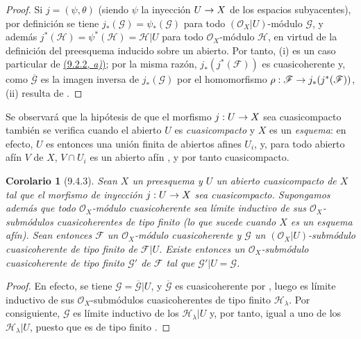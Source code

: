 \documentclass[oneside]{amsart}
\theoremstyle{ega-env-style}
\theoremstyle{ega-thm-env-style}
\newtheorem*{corollary}{Corolario}
\theoremstyle{ega-defn-env-style}
\renewcommand{\to}{\mathchoice{\longrightarrow}{\rightarrow}{\rightarrow}{\rightarrow}}
\let\EGAOriginalLabel\label
\renewcommand{\label}[1]{\phantomsection\EGAOriginalLabel{#1}}
\begin{document}
\begin{proof}
Si $j=(\psi,\theta)$ (siendo $\psi$ la inyección $U\to X$ de los espacios subyacentes),
por definición se tiene $j_*(\mathscr{G})=\psi_*(\mathscr{G})$ para todo
$(\mathscr{O}_X|U)$-módulo $\mathscr{G}$, y además
$j^*(\mathscr{H})=\psi^*(\mathscr{H})=\mathscr{H}|U$ para todo $\mathscr{O}_X$-módulo $\mathscr{H}$, en virtud
de la definición del preesquema inducido sobre un abierto. Por tanto, (i) es un caso
particular de \hyperref[I.9.2.2]{(9.2.2, \emph{a)})}; por la misma razón, $j_*(j^*(\mathscr{F}))$ es
cuasicoherente y, como $\overline{\mathscr{G}}$ es la imagen inversa de $j_*(\mathscr{G})$ por el
homomorfismo $\rho:\mathscr{F}\to j_*(j^*(\mathscr{F}))$, (ii) resulta de .
\end{proof}

Se observará que la hipótesis de que el morfismo $j:U\to X$ sea cuasicompacto también se
verifica cuando el abierto $U$ es \emph{cuasicompacto} y $X$ es un \emph{esquema}: en
efecto, $U$ es entonces una unión finita de abiertos afines $U_i$, y, para todo abierto
afín $V$ de $X$, $V\cap U_i$ es un abierto afín , y por tanto
cuasicompacto.

\begin{corollary}[9.4.3]
\label{I.9.4.3}
Sean $X$ un preesquema y $U$ un abierto cuasicompacto de $X$ tal que el morfismo de
inyección $j:U\to X$ sea cuasicompacto. Supongamos además que todo $\mathscr{O}_X$-módulo
cuasicoherente sea límite inductivo de sus $\mathscr{O}_X$-submódulos cuasicoherentes de tipo
finito \emph{(lo que sucede cuando $X$ es un \emph{esquema afín})}. Sean entonces
$\mathscr{F}$ un $\mathscr{O}_X$-módulo cuasicoherente y $\mathscr{G}$ un
$(\mathscr{O}_X|U)$-submódulo cuasicoherente \textup{de tipo finito} de $\mathscr{F}|U$. Existe entonces
un $\mathscr{O}_X$-submódulo cuasicoherente \textup{de tipo finito} $\mathscr{G}'$ de $\mathscr{F}$ tal que
$\mathscr{G}'|U=\mathscr{G}$.
\end{corollary}

\begin{proof}
En efecto, se tiene $\mathscr{G}=\overline{\mathscr{G}}|U$, y $\overline{\mathscr{G}}$ es cuasicoherente
por , luego es límite inductivo de sus $\mathscr{O}_X$-submódulos cuasicoherentes
de tipo finito $\mathscr{H}_\lambda$. Por consiguiente, $\mathscr{G}$ es límite inductivo de los
$\mathscr{H}_\lambda|U$ y, por tanto, igual a uno de los $\mathscr{H}_\lambda|U$, puesto que es de
tipo finito .
\end{proof}
\end{document}
